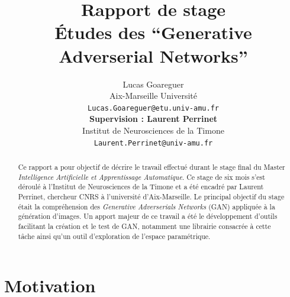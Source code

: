 \documentclass[11pt,francais]{article}
\title{Rapport de stage\\ Études des ``Generative Adverserial Networks''}
\author{Lucas Goareguer \\
  Aix-Marseille Université \\
  {\small \texttt{Lucas.Goareguer@etu.univ-amu.fr}   } \\\And
   {\bf Supervision : Laurent Perrinet} \\
  Institut de Neurosciences de la Timone \\
  {\small \tt Laurent.Perrinet@univ-amu.fr} \\}
\date{}
\begin{document}
\maketitle
\begin{abstract}
Ce rapport a pour objectif de décrire le travail effectué durant le stage final du Master \emph{Intelligence Artificielle et Apprentissage Automatique}. Ce stage de six mois s'est déroulé à l'Institut de Neurosciences de la Timone et a été encadré par Laurent Perrinet, chercheur CNRS à l'université d'Aix-Marseille. Le principal objectif du stage était la compréhension des \textit{Generative Adverserials Networks} (GAN) appliquée à la génération d'images. Un apport majeur de ce travail a été le développement d'outils facilitant la création et le test de GAN, notamment une librairie consacrée à cette tâche ainsi qu'un outil d'exploration de l'espace paramétrique.
\end{abstract}


\section{Motivation}
\end{document}
